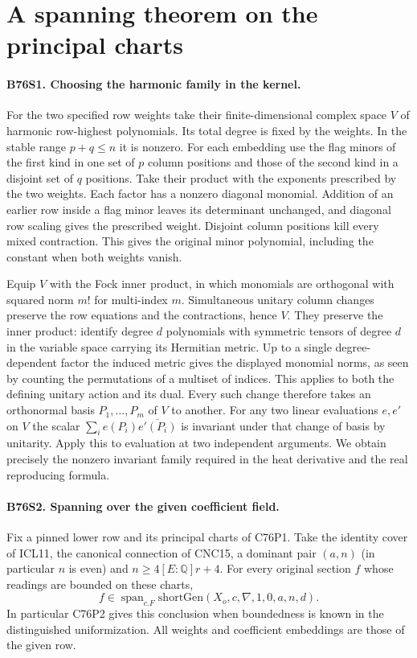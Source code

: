 \section{A spanning theorem on the principal charts}

\paragraph{B76S1. Choosing the harmonic family in the kernel.}
For the two specified row weights take their finite-dimensional
complex space $V$ of harmonic row-highest polynomials. Its total
degree is fixed by the weights. In the stable range $p+q\le n$
it is nonzero. For each embedding use the flag minors of the first
kind in one set of $p$ column positions and those of the second
kind in a disjoint set of $q$ positions. Take their product with
the exponents prescribed by the two weights. Each factor has
a nonzero diagonal monomial. Addition of an earlier row inside
a flag minor leaves its determinant unchanged, and diagonal row
scaling gives the prescribed weight. Disjoint column positions
kill every mixed contraction. This gives the original minor
polynomial, including the constant when both weights vanish.

Equip $V$ with the Fock inner product, in which monomials are
orthogonal with squared norm $m!$ for multi-index $m$.
Simultaneous unitary column changes preserve the row equations
and the contractions, hence $V$. They preserve the inner product:
identify degree $d$ polynomials with symmetric tensors of degree
$d$ in the variable space carrying its Hermitian metric. Up to a
single degree-dependent factor the induced metric gives the
displayed monomial norms, as seen by counting the permutations
of a multiset of indices. This applies to both the defining
unitary action and its dual. Every such change therefore takes an
orthonormal basis $P_1,\ldots,P_m$ of $V$ to another.
For any two linear evaluations $e,e'$ on $V$ the scalar
$\sum_i e(P_i)\overline{e'(P_i)}$ is invariant under that change
of basis by unitarity. Apply this to evaluation at two independent
arguments. We obtain precisely the nonzero invariant family
required in the heat derivative and the real reproducing formula.

\paragraph{B76S2. Spanning over the given coefficient field.}
Fix a pinned lower row and its principal charts of C76P1. Take the
identity cover of ICL11, the canonical connection of CNC15, a
dominant pair $(a,n)$ (in particular $n$ is even) and
$n\ge4[E:\mathbb Q]r+4$. For every original section $f$ whose
readings are bounded on these charts,
\[
 f\in\operatorname{span}_{c.F}
      \mathrm{shortGen}(X_o,c,\nabla,1,0,a,n,d).
\]
In particular C76P2 gives this conclusion when boundedness is
known in the distinguished uniformization. All weights and
coefficient embeddings are those of the given row.

